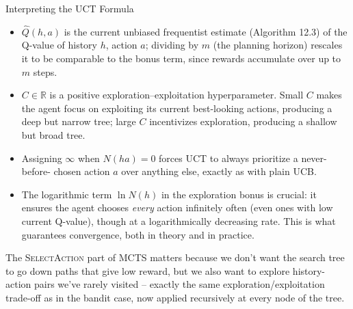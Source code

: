 \documentclass[aspectratio=169,10pt]{beamer}
\newcommand{\RR}{\mathbb{R}}
\begin{document}
\begin{frame}{Interpreting the UCT Formula}
\begin{itemize}
\item $\widehat Q(h,a)$ is the current unbiased frequentist estimate (Algorithm 12.3) of
the Q-value of history $h$, action $a$; dividing by $m$ (the planning horizon) rescales it
to be comparable to the bonus term, since rewards accumulate over up to $m$ steps.
\item $C\in\RR$ is a positive exploration--exploitation hyperparameter. Small $C$ makes
the agent focus on exploiting its current best-looking actions, producing a deep but
narrow tree; large $C$ incentivizes exploration, producing a shallow but broad tree.
\item Assigning $\infty$ when $N(ha)=0$ forces UCT to always prioritize a never-before-
chosen action $a$ over anything else, exactly as with plain UCB.
\item The logarithmic term $\ln N(h)$ in the exploration bonus is crucial: it ensures the
agent chooses \emph{every} action infinitely often (even ones with low current Q-value),
though at a logarithmically decreasing rate. This is what guarantees convergence, both in
theory and in practice.
\end{itemize}
The \textsc{SelectAction} part of MCTS matters because we don't want the search tree to go
down paths that give low reward, but we also want to explore history-action pairs we've
rarely visited -- exactly the same exploration/exploitation trade-off as in the bandit
case, now applied recursively at every node of the tree.
\end{frame}
\end{document}
